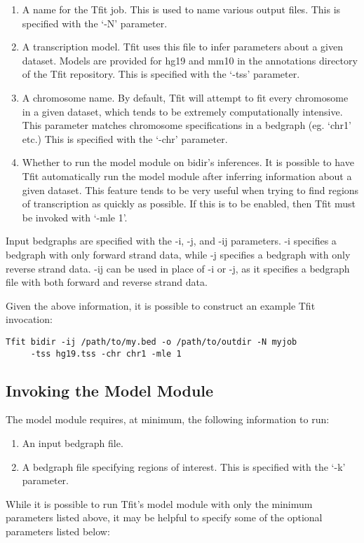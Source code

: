 \documentclass[12pt,letterpaper]{article}
\begin{document}
\begin{enumerate}
\item A name for the Tfit job. This is used to name various output files. This is specified with the `-N' parameter.
\item A transcription model. Tfit uses this file to infer parameters about a given dataset. Models are provided for hg19 and mm10 in the annotations directory of the Tfit repository. This is specified with the `-tss' parameter.
\item A chromosome name. By default, Tfit will attempt to fit every chromosome in a given dataset, which tends to be extremely computationally intensive. This parameter matches chromosome specifications in a bedgraph (eg. `chr1' etc.) This is specified with the `-chr' parameter.
\item Whether to run the model module on bidir's inferences. It is possible to have Tfit automatically run the model module after inferring information about a given dataset. This feature tends to be very useful when trying to find regions of transcription as quickly as possible. If this is to be enabled, then Tfit must be invoked with `-mle 1'.
\end{enumerate}

Input bedgraphs are specified with the -i, -j, and -ij parameters. -i specifies a bedgraph with only forward strand data, while -j specifies a bedgraph with only reverse strand data. -ij can be used in place of -i or -j, as it specifies a bedgraph file with both forward and reverse strand data.

Given the above information, it is possible to construct an example Tfit invocation:
\begin{lstlisting}
Tfit bidir -ij /path/to/my.bed -o /path/to/outdir -N myjob 
     -tss hg19.tss -chr chr1 -mle 1
\end{lstlisting}

\subsection{Invoking the Model Module}
The model module requires, at minimum, the following information to run:
\begin{enumerate}
\item An input bedgraph file.
\item A bedgraph file specifying regions of interest. This is specified with the `-k' parameter.
\end{enumerate}

While it is possible to run Tfit's model module with only the minimum parameters listed above, it may be helpful to specify some of the optional parameters listed below:
\end{document}
